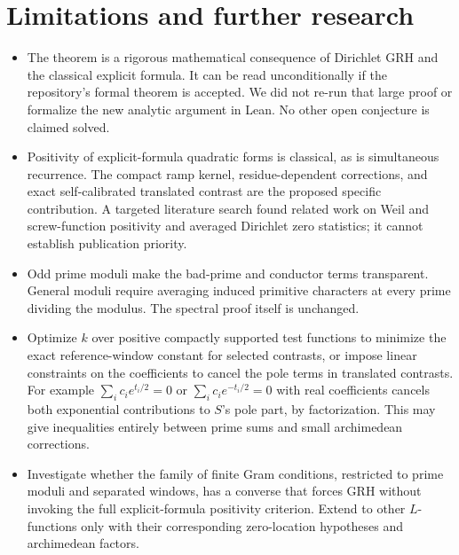 \documentclass[11pt]{article}
\begin{document}
\section{Limitations and further research}
\begin{itemize}
\item The theorem is a rigorous mathematical consequence of Dirichlet GRH and the classical explicit formula. It can be read unconditionally if the repository's formal theorem is accepted. We did not re-run that large proof or formalize the new analytic argument in Lean. No other open conjecture is claimed solved.
\item Positivity of explicit-formula quadratic forms is classical, as is simultaneous recurrence. The compact ramp kernel, residue-dependent corrections, and exact self-calibrated translated contrast are the proposed specific contribution. A targeted literature search found related work on Weil and screw-function positivity and averaged Dirichlet zero statistics; it cannot establish publication priority.
\item Odd prime moduli make the bad-prime and conductor terms transparent. General moduli require averaging induced primitive characters at every prime dividing the modulus. The spectral proof itself is unchanged.
\item Optimize $k$ over positive compactly supported test functions to minimize the exact reference-window constant for selected contrasts, or impose linear constraints on the coefficients to cancel the pole terms in translated contrasts. For example $\sum_i c_i e^{t_i/2}=0$ or $\sum_i c_i e^{-t_i/2}=0$ with real coefficients cancels both exponential contributions to $S$'s pole part, by factorization. This may give inequalities entirely between prime sums and small archimedean corrections.
\item Investigate whether the family of finite Gram conditions, restricted to prime moduli and separated windows, has a converse that forces GRH without invoking the full explicit-formula positivity criterion. Extend to other $L$-functions only with their corresponding zero-location hypotheses and archimedean factors.
\end{itemize}
\end{document}
